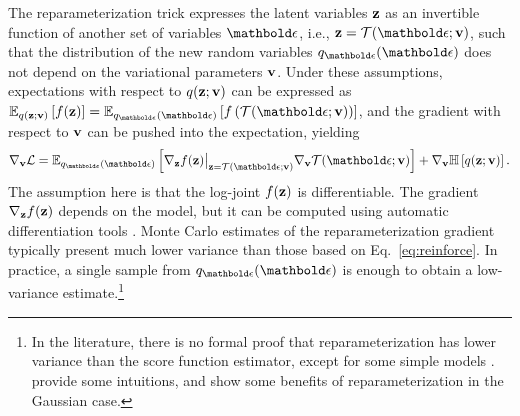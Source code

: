  The reparameterization trick \citep{Salimans2013,Kingma2014} expresses the latent variables $\mathbf{z}$ as an invertible function of another set of variables $\beps$, i.e., $\bz=\Tcal(\beps;\bv)$, such that the distribution of the new random variables $q_{\beps}(\beps)$ does not depend on the variational parameters $\mathbf{v}$. Under these assumptions, expectations with respect to $q(\mathbf{z};\mathbf{v})$ can be expressed as $\E{q(\bz;\bv)}{f(\bz)}=\E{q_{\beps}(\beps)}{f\left(\Tcal(\beps;\bv)\right)}$, and the gradient with respect to $\mathbf{v}$ can be pushed into the expectation, yielding
\begin{equation}\label{eq:reparam}
	\nabla_{\bv}\Lcal = \E{q_{\beps}(\beps)}{\nabla_{\bz}f(\bz)\big|_{\bz=\Tcal(\beps;\bv)} \nabla_{\bv} \Tcal(\beps;\bv)} + \nabla_{\bv}\ent{q(\bz;\bv)}.
\end{equation}
The assumption here is that the log-joint $f(\mathbf{z})$ is differentiable. The gradient $\nabla_{\mathbf{z}}f(\mathbf{z})$ depends on the model, but it can be computed using automatic differentiation tools \citep{Baydin2015}. Monte Carlo estimates of the reparameterization gradient typically present much lower variance than those based on Eq.~\ref{eq:reinforce}. In practice, a single sample from $q_{\beps}(\beps)$ is enough to obtain a low-variance estimate.\footnote{In the literature, there is no formal proof that reparameterization has lower variance than the score function estimator, except for some simple models \citep{Fan2015}. \citet{Titsias2014_doubly} provide some intuitions, and \citet{Rezende2014} show some benefits of reparameterization in the Gaussian case.}

